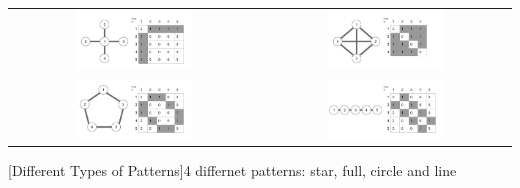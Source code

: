 \begin{table}[tp]
  \centering
\begin{tabu}{cc}
	\includegraphics[width=0.49\textwidth]{images/pattern_star}  &
	\includegraphics[width=0.49\textwidth]{images/pattern_full} \\
	\includegraphics[width=0.49\textwidth]{images/pattern_circle} &
	\includegraphics[width=0.49\textwidth]{images/pattern_line} 
\end{tabu}
[Different Types of Patterns]{4 differnet patterns: star, full, circle and line\label{fig:patterns}}
\end{table}
